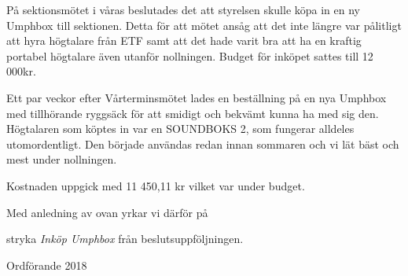 \documentclass[../_main/handlingar.tex]{subfiles}
\begin{document}
På sektionsmötet i våras beslutades det att styrelsen skulle köpa in en ny Umphbox till sektionen. Detta för att mötet ansåg att det inte längre var pålitligt att hyra högtalare från ETF samt att det hade varit bra att ha en kraftig portabel högtalare även utanför nollningen. Budget för inköpet sattes till 12 000kr.

Ett par veckor efter Vårterminsmötet lades en beställning på en nya Umphbox med tillhörande ryggsäck för att smidigt och bekvämt kunna ha med sig den. Högtalaren som köptes in var en SOUNDBOKS 2, som fungerar alldeles utomordentligt. Den började användas redan innan sommaren och vi lät bäst och mest under nollningen.

Kostnaden uppgick med 11 450,11 kr vilket var under budget.

Med anledning av ovan yrkar vi därför på
\begin{attsatser}
    \att stryka \emph{Inköp Umphbox} från beslutsuppföljningen.
\end{attsatser}

\begin{signatures}{1}
    \ist
	\signature{Daniel Bakic}{Ordförande 2018}
\end{signatures}
\end{document}
